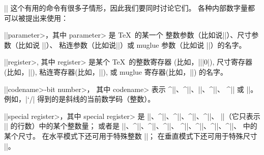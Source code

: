 {{{{{{{{%
\ddanger |\the| 这个有用的命令有很多子情形，因此我们要同时讨论它们。%
各种内部数字量都可以被提出来使用：
\enddanger

\nobreak\medskip
\textindent\bull |\the|\<parameter>，其中 \<parameter> 是 \TeX\ 的某一个
整数参数（比如说\break |\the\widowpenalty|）、尺寸参数（比如说 |\the\parindent|）、
粘连参数（比如说\break |\the\leftskip|）或 muglue 参数（比如说 |\the\thinmuskip|）的名字。

\smallbreak
\textindent\bull |\the|\<register>, 其中 \<register> 是某个 \TeX\ 的整数寄存器%
(比如，|\the\count|\stretch|0|), 尺寸寄存器(比如，|\the{}|),
粘连寄存器(比如，|\the{}|), 或 muglue 寄存器(比如，|\the\muskip{}|)%
的名字。

\smallbreak
\textindent\bull |\the|\<codename>-bit number>，
其中 \<codename> 表示 ^|\lccode|、^|\uccode|、|\catcode|、^|\mathcode|、
^|\sfcode| 或 |\delcode|。
例如，|\the\mathcode`/| 得到的是斜线的当前数学码（整数）。

\smallbreak
\textindent\bull |\the|\<special register>，其中 \<special register> 是
|\prevgraf|、^|\deadcycles|、^|\insertpenalties|、^||、^|\badness|、
|\parshape|（它只表示 |\parshape| 的行数）中的某个整数量；
或者是 |\pagetotal|、^|\pagegoal|、^|\pagedepth|、^|\pagestretch|、
^|\pagefilstretch|、^|\pagefillstretch|、^|\pagefilllstretch|、^|\pageshrink|、
中的某个尺寸。
在水平模式下还可用于特殊整数 |\the\spacefactor|；
在垂直模式下还可用于特殊尺寸 |\the\prevdepth|。

}}}}}}}}
